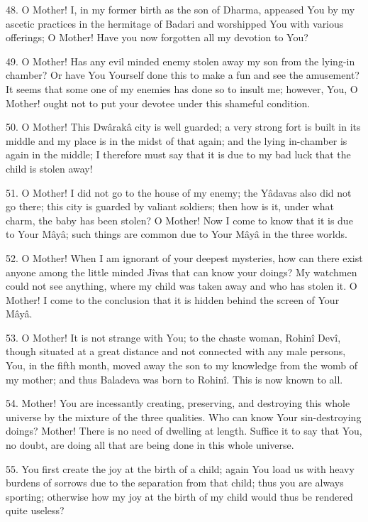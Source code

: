 48. O Mother! I, in my former birth as the son of Dharma, appeased You by my ascetic practices in the hermitage of Badari and worshipped You with various offerings; O Mother! Have you now forgotten all my devotion to You?

49. O Mother! Has any evil minded enemy stolen away my son from the lying-in chamber? Or have You Yourself done this to make a fun and see the amusement? It seems that some one of my enemies has done so to insult me; however, You, O Mother! ought not to put your devotee under this shameful condition.

50. O Mother! This Dw\^arak\^a city is well guarded; a very strong fort is built in its middle and my place is in the midst of that again; and the lying in-chamber is again in the middle; I therefore must say that it is due to my bad luck that the child is stolen away!

51. O Mother! I did not go to the house of my enemy; the Y\^adavas also did not go there; this city is guarded by valiant soldiers; then how is it, under what charm, the baby has been stolen? O Mother! Now I come to know that it is due to Your M\^ay\^a; such things are common due to Your M\^ay\^a in the three worlds.

52. O Mother! When I am ignorant of your deepest mysteries, how can there exist anyone among the little minded J\^ivas that can know your doings? My watchmen could not see anything, where my child was taken away and who has stolen it. O Mother! I come to the conclusion that it is hidden behind the screen of Your M\^ay\^a.

53. O Mother! It is not strange with You; to the chaste woman, Rohin\^i Dev\^i, though situated at a great distance and not connected with any male persons, You, in the fifth month, moved away the son to my knowledge from the womb of my mother; and thus Baladeva was born to Rohin\^i. This is now known to all.

54. Mother! You are incessantly creating, preserving, and destroying this whole universe by the mixture of the three qualities. Who can know Your sin-destroying doings? Mother! There is no need of dwelling at length. Suffice it to say that You, no doubt, are doing all that are being done in this whole universe.

55. You first create the joy at the birth of a child; again You load us with heavy burdens of sorrows due to the separation from that child; thus you are always sporting; otherwise how my joy at the birth of my child would thus be rendered quite useless?

